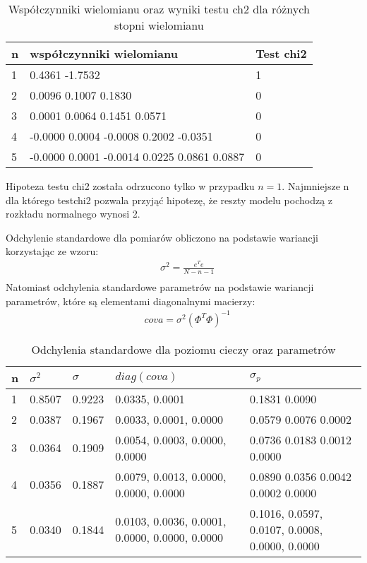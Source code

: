 \documentclass[a4paper,15pt]{article}
\begin{document}
\begin{table}[H]
\caption{Współczynniki wielomianu oraz wyniki testu ch2 dla różnych stopni wielomianu}
\begin{center}
\begin{tabular}{|l|l|l|}
\hline
n & współczynniki wielomianu & Test chi2 \\ \hline
1 & 0.4361 -1.7532 & 1  \\ \hline
2 & 0.0096    0.1007    0.1830 & 0  \\ \hline
3 & 0.0001    0.0064    0.1451    0.0571 & 0  \\ \hline
4 & -0.0000    0.0004   -0.0008    0.2002   -0.0351 & 0  \\ \hline
5 & -0.0000    0.0001   -0.0014    0.0225    0.0861    0.0887 & 0 \\ \hline
\end{tabular}
\end{center}
\end{table}
Hipoteza testu chi2 została odrzucono tylko w przypadku \( n = 1 \). Najmniejsze n dla którego testchi2 pozwala przyjąć hipotezę, że reszty modelu pochodzą z rozkładu normalnego wynosi 2. 

Odchylenie standardowe dla pomiarów obliczono na podstawie wariancji korzystając ze wzoru:
\begin{align*}
& \sigma ^2 = \frac{e^Te}{N-n-1}\\
\end{align*} 
Natomiast odchylenia standardowe parametrów na podstawie wariancji parametrów, które są elementami diagonalnymi macierzy:
\begin{align*}
& cov a = \sigma ^ 2 ( \Phi^T \Phi)^{-1}
\end{align*} 

\begin{table}[H]
\caption{Odchylenia standardowe dla poziomu cieczy oraz parametrów }
\begin{center}
\begin{tabular}{|l|l|l|l|l|}
\hline
n & \( \sigma ^2 \) & \( \sigma \) & \( diag(cova) \) & \( \sigma_p \) \\ \hline
1 & 0.8507 &    0.9223 &  0.0335, 0.0001  &   0.1831    0.0090\\ \hline
2 &    0.0387   & 0.1967  &  0.0033,  0.0001, 0.0000  &     0.0579    0.0076    0.0002 \\ \hline
3 & 0.0364 & 0.1909 &  0.0054,  0.0003, 0.0000,  0.0000 &  0.0736    0.0183    0.0012    0.0000 \\ \hline
4 &  0.0356 & 0.1887 & 0.0079, 0.0013, 0.0000,  0.0000,  0.0000  &   0.0890    0.0356    0.0042    0.0002    0.0000 \\ \hline
5 &  0.0340 & 0.1844 & 0.0103,   0.0036, 0.0001, 0.0000, 0.0000, 0.0000  & 0.1016,    0.0597,    0.0107,    0.0008,   0.0000,    0.0000 \\ \hline
\end{tabular}
\end{center}
\end{table}
\end{document}
